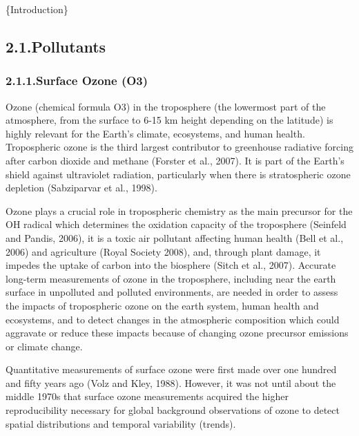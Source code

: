 \documentclass[9pt]{report}
\begin{document}
\noindent{}\{Introduction\}%

\subsection{2.1.\hspace*{0.5em}Pollutants}\label{sec-pollutants}%

\subsubsection{2.1.1.\hspace*{0.5em}Surface Ozone (O3)}\label{sec-surface-ozone-osub3sub}%

\noindent{}Ozone (chemical formula O3) in the troposphere (the lowermost part of the atmosphere, from the surface to 6-15 km height depending on the latitude) is highly relevant for the Earth’s climate, ecosystems, and human health.
Tropospheric ozone is the third largest contributor to greenhouse radiative forcing after carbon dioxide and methane (Forster et al., 2007).
It is part of the Earth’s shield against ultraviolet radiation, particularly when there is stratospheric ozone depletion (Sabziparvar et al., 1998).%

Ozone plays a crucial role in tropospheric chemistry as the main precursor for the OH radical which determines the oxidation capacity of the troposphere (Seinfeld and Pandis, 2006), it is a toxic air pollutant affecting human health (Bell et al., 2006) and agriculture (Royal Society 2008), and, through plant damage, it impedes the uptake of carbon into the biosphere (Sitch et al., 2007). 
Accurate long-term measurements of ozone in the troposphere, including near the earth surface in unpolluted and polluted environments, are needed in order to assess the impacts of tropospheric ozone on the earth system, human health and ecosystems, and to detect changes in the atmospheric composition which could aggravate or reduce these impacts because of changing ozone precursor emissions or climate change.%

Quantitative measurements of surface ozone were first made over one hundred and fifty years ago (Volz and Kley, 1988).
However, it was not until about the middle 1970s that surface ozone measurements acquired the higher reproducibility necessary for global background observations of ozone to detect spatial distributions and temporal variability (trends).%
\end{document}
